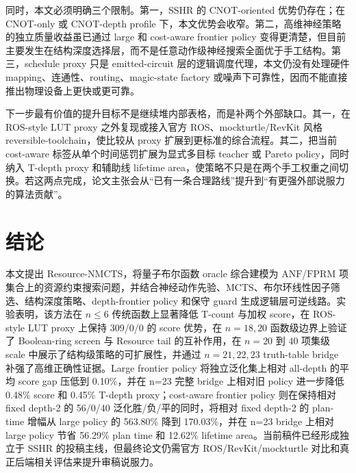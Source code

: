 \documentclass[UTF8,fontset=macnew,11pt]{ctexart}
\newcommand{\method}{Resource-NMCTS}
\newcommand{\screen}{Boolean-ring screen}
\newcommand{\anf}{\ensuremath{\mathrm{ANF}}}
\newcommand{\fprm}{\ensuremath{\mathrm{FPRM}}}
\newcommand{\mcts}{\ensuremath{\mathrm{MCTS}}}
\begin{document}
同时，本文必须明确三个限制。第一，SSHR 的 CNOT-oriented 优势仍存在；在 CNOT-only 或 CNOT-depth profile 下，本文优势会收窄。第二，高维神经策略的独立质量收益虽已通过 large 和 cost-aware frontier policy 变得更清楚，但目前主要发生在结构深度选择层，而不是任意动作级神经搜索全面优于手工结构。第三，schedule proxy 只是 emitted-circuit 层的逻辑调度代理，本文仍没有处理硬件 mapping、连通性、routing、magic-state factory 或噪声下可靠性，因而不能直接推出物理设备上更快或更可靠。

下一步最有价值的提升目标不是继续堆内部表格，而是补两个外部缺口。其一，在 ROS-style LUT proxy 之外复现或接入官方 ROS、mockturtle/RevKit 风格 reversible-toolchain，使比较从 proxy 扩展到更标准的综合流程。其二，把当前 cost-aware 标签从单个时间惩罚扩展为显式多目标 teacher 或 Pareto policy，同时纳入 T-depth proxy 和辅助线 lifetime area，使策略不只是在两个手工权重之间切换。若这两点完成，论文主张会从“已有一条合理路线”提升到“有更强外部说服力的算法贡献”。

\section{结论}

本文提出 \method{}，将量子布尔函数 oracle 综合建模为 \anf{}/\fprm{} 项集合上的资源约束搜索问题，并结合神经动作先验、\mcts{}、布尔环线性因子筛选、结构深度策略、depth-frontier policy 和保守 guard 生成逻辑层可逆线路。实验表明，该方法在 $n\leq6$ 传统函数上显著降低 T-count 与加权 score，在 ROS-style LUT proxy 上保持 309/0/0 的 score 优势，在 $n=18,20$ 函数级边界上验证了 \screen{} 与 Resource tail 的互补作用，在 $n=20$ 到 $40$ 项集级 scale 中展示了结构级策略的可扩展性，并通过 $n=21,22,23$ truth-table bridge 补强了高维正确性证据。Large frontier policy 将独立泛化集上相对 all-depth 的平均 score gap 压低到 0.10\%，并在 n=23 完整 bridge 上相对旧 policy 进一步降低 0.48\% score 和 0.45\% T-depth proxy；cost-aware frontier policy 则在保持相对 fixed depth-2 的 56/0/40 泛化胜/负/平的同时，将相对 fixed depth-2 的 plan-time 增幅从 large policy 的 563.80\% 降到 170.03\%，并在 n=23 bridge 上相对 large policy 节省 56.29\% plan time 和 12.62\% lifetime area。当前稿件已经形成独立于 SSHR 的投稿主线，但最终论文仍需官方 ROS/RevKit/mockturtle 对比和真正后端相关评估来提升审稿说服力。
\end{document}
